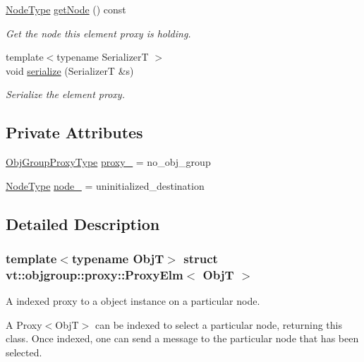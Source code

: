 \begin{DoxyCompactItemize}
\hyperlink{namespacevt_a866da9d0efc19c0a1ce79e9e492f47e2}{Node\+Type} \hyperlink{structvt_1_1objgroup_1_1proxy_1_1_proxy_elm_a2a2067c00f4d5bc4b07dfb371f2f0d7a}{get\+Node} () const
\begin{DoxyCompactList}\small\item\em Get the node this element proxy is holding. \end{DoxyCompactList}\item 
{\footnotesize template$<$typename SerializerT $>$ }\\void \hyperlink{structvt_1_1objgroup_1_1proxy_1_1_proxy_elm_aa2c6be8bfa1113516cd6e8b3d7bd0445}{serialize} (SerializerT \&s)
\begin{DoxyCompactList}\small\item\em Serialize the element proxy. \end{DoxyCompactList}\end{DoxyCompactItemize}
\subsection*{Private Attributes}
\begin{DoxyCompactItemize}
\item 
\hyperlink{namespacevt_ad7cae989df485fccca57f0792a880a8e}{Obj\+Group\+Proxy\+Type} \hyperlink{structvt_1_1objgroup_1_1proxy_1_1_proxy_elm_ab8a57044d257ea520a080de9f3389ba5}{proxy\+\_\+} = no\+\_\+obj\+\_\+group
\item 
\hyperlink{namespacevt_a866da9d0efc19c0a1ce79e9e492f47e2}{Node\+Type} \hyperlink{structvt_1_1objgroup_1_1proxy_1_1_proxy_elm_a0655b033581faad1cab6bf7402e36aac}{node\+\_\+} = uninitialized\+\_\+destination
\end{DoxyCompactItemize}


\subsection{Detailed Description}
\subsubsection*{template$<$typename ObjT$>$\newline
struct vt\+::objgroup\+::proxy\+::\+Proxy\+Elm$<$ Obj\+T $>$}

A indexed proxy to a object instance on a particular node. 

A {\ttfamily Proxy$<$\+Obj\+T$>$} can be indexed to select a particular node, returning this class. Once indexed, one can send a message to the particular node that has been selected. 

